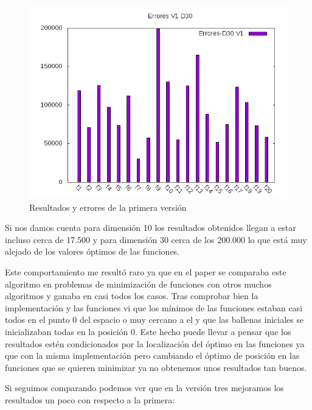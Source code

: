 \documentclass[12pt,a4paper]{article}
\begin{document}
\begin{figure}[!h]
		\includegraphics[scale=0.5]{../Algoritmo/resultados/Imagenes/Errores/errores_v1_d30.png}
		\caption{Resultados y errores de la primera versión}
	\end{figure}

	Si nos damos cuenta para dimensión 10 los resultados obtenidos llegan a estar incluso cerca de 17.500 y para dimensión 30 cerca de los 200.000 lo que está muy alejado de los valores óptimos de las funciones. 
	
	Este comportamiento me resultó raro ya que en el paper se comparaba este algoritmo en problemas de minimización de funciones con otros muchos algoritmos y ganaba en casi todos los casos. Tras comprobar bien la implementación y las funciones vi que los mínimos de las funciones estaban casi todos en el punto 0 del espacio o muy cercano a el y que las ballenas iniciales se inicializaban todas en la posición 0. Este hecho puede llevar a pensar que los resultados estén condicionados por la localización del óptimo en las funciones ya que con la misma implementación pero cambiando el óptimo de posición en las funciones que se quieren minimizar ya no obtenemos unos resultados tan buenos.
	
	Si seguimos comparando podemos ver que en la versión tres mejoramos los resultados un poco con respecto a la primera:
	
\end{document}
